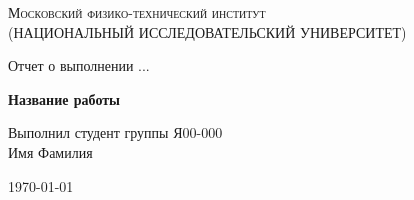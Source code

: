 \documentclass[a4paper, 12pt]{article}
\begin{document}
\begin{titlepage}
	\centering
	\vspace{5cm} %
	{\scshape\large Московский физико-технический институт \\
	(НАЦИОНАЛЬНЫЙ ИССЛЕДОВАТЕЛЬСКИЙ УНИВЕРСИТЕТ)} %
	
	\vspace{4cm} %
	{\LARGE Отчет о выполнении ...}
	
	\vspace{1cm} %
	{\Huge\bf Название работы }
	
	\vspace{1cm} %
	\vfill %
	
\begin{flushright} %
	{\LARGE Выполнил студент группы Я00-000 \\ Имя Фамилия}
\end{flushright}
	

	\vfill

	\today %
\end{titlepage}
\end{document}
